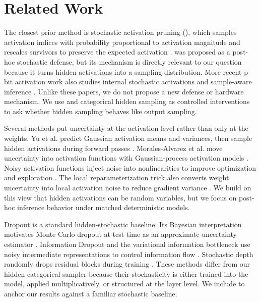 \section{Related Work}
\label{sec:related}

The closest prior method is stochastic activation pruning (\sap), which samples activation indices with probability proportional to activation magnitude and rescales survivors to preserve the expected activation \cite{dhillon2018stochastic}. \sap was proposed as a post-hoc stochastic defense, but its mechanism is directly relevant to our question because it turns hidden activations into a sampling distribution. More recent p-bit activation work also studies internal stochastic activations and sample-aware inference \cite{ghantasala2026improving}. Unlike these papers, we do not propose a new defense or hardware mechanism. We use \sap and categorical hidden sampling as controlled interventions to ask whether hidden sampling behaves like output sampling.

Several methods put uncertainty at the activation level rather than only at the weights. Yu et al. predict Gaussian activation means and variances, then sample hidden activations during forward passes \cite{yu2021simple}. Morales-Alvarez et al. move uncertainty into activation functions with Gaussian-process activation models \cite{moralesalvarez2021activation}. Noisy activation functions inject noise into nonlinearities to improve optimization and exploration \cite{gulcehre2016noisy}. The local reparameterization trick also converts weight uncertainty into local activation noise to reduce gradient variance \cite{kingma2015variational}. We build on this view that hidden activations can be random variables, but we focus on post-hoc inference behavior under matched deterministic models.

Dropout is a standard hidden-stochastic baseline. Its Bayesian interpretation motivates Monte Carlo dropout at test time as an approximate uncertainty estimator \cite{gal2016dropout}. Information Dropout and the variational information bottleneck use noisy intermediate representations to control information flow \cite{achille2016information,alemi2017deep}. Stochastic depth randomly drops residual blocks during training \cite{huang2016deep}. These methods differ from our hidden categorical sampler because their stochasticity is either trained into the model, applied multiplicatively, or structured at the layer level. We include \mcdropout to anchor our results against a familiar stochastic baseline.

